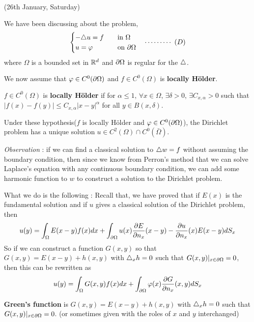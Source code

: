 \documentclass[12pt,a4paper]{article}
\begin{document}
\newday

(26th January, Saturday)
\s

We have been discussing about the problem,
\begin{align*}
\begin{cases}
-\triangle u =f \quad &\text{in }\Omega \\
u=\varphi \quad &\text{on } \partial \Omega
\end{cases} \quad \cdots\cdots\cdots\,\,(D)
\end{align*}
where $\Omega$ is a bounded set in $\mathbb{R}^d$ and $\partial \Omega$ is regular for the $\triangle$.
\s

We now assume that $\varphi \in C^0(\partial \Omega)$ and $f\in C^0(\Omega)$ is \textbf{locally H\"older}.
\s

 $f\in C^0(\Omega)$ is \textbf{locally H\"older} if for $\alpha\leq 1$, $\forall x\in \Omega$, $\exists\delta>0$, $\exists C_{x,\alpha}>0$ such that $|f(x)-f(y)|\leq C_{x,\alpha} |x-y|^{\alpha}$ for all $y\in B(x,\delta)$.
\s

 Under these hypothesis($f$ is locally H\"older and $\varphi \in C^0(\partial \Omega)$), the Dirichlet problem has a unique solution $u\in C^2(\Omega) \cap C^0(\bar{\Omega})$.
\s

\emph{Observation} : if we can find a classical solution to $\triangle w = f$ without assuming the boundary condition, then since we know from Perron's method that we can solve Laplace's equation with any continuous boundary condition, we can add some harmonic function to $w$ to construct a solution to the Dirichlet problem.
\s

What we do is the following : Recall that, we have proved that if $E(x)$ is the fundamental solution and if $u$ gives a classical solution of the Dirichlet problem, then
\begin{align*}
u(y)= \int_{\Omega} E(x-y) f(x)dx + \int_{\partial \Omega} u(x)\frac{\partial E}{\partial n_x} (x-y) - \frac{\partial u}{\partial n_x}(x) E(x-y) dS_x
\end{align*}
So if we can construct a function $G(x,y)$ so that $G(x,y) = E(x-y) +h(x,y)$ with $\triangle_x h =0$ such that $G(x,y)|_{x\in \partial \Omega} =0$, then this can be rewritten as
\begin{align*}
u(y) = \int_{\Omega} G(x,y) f(x) dx + \int_{\partial \Omega} \varphi(x) \frac{\partial G}{\partial n_x}(x,y) dS_x
\end{align*}
\s

 \textbf{Green's function} is $G(x,y) = E(x-y) +h(x,y)$ with $\triangle_x h =0$ such that $G(x,y)|_{x\in \partial \Omega} =0$. (or sometimes given with the roles of $x$ and $y$ interchanged)
\s
\end{document}
